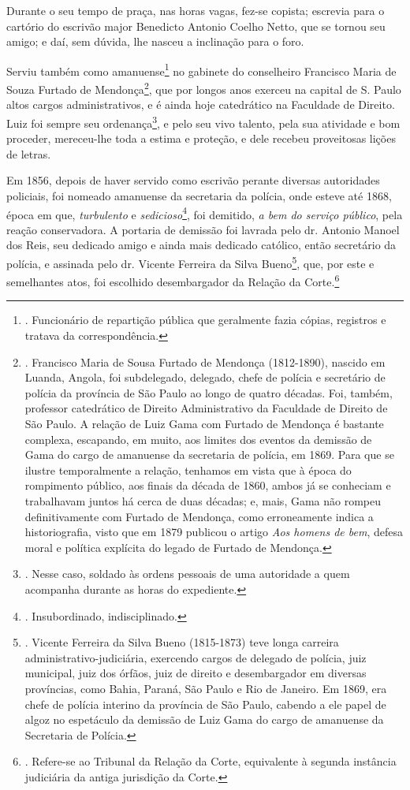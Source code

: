 Durante o seu tempo de praça, nas horas vagas, fez-se copista; escrevia
para o cartório do escrivão major Benedicto Antonio Coelho Netto, que se
tornou seu amigo; e daí, sem dúvida, lhe nasceu a inclinação para o
foro.

Serviu também como amanuense\footnote{. Funcionário de repartição
  pública que geralmente fazia cópias, registros e tratava da
  correspondência.} no gabinete do conselheiro Francisco Maria de Souza
Furtado de Mendonça\footnote{. Francisco Maria de Sousa Furtado de
  Mendonça (1812-1890), nascido em Luanda, Angola, foi subdelegado,
  delegado, chefe de polícia e secretário de polícia da província de São
  Paulo ao longo de quatro décadas. Foi, também, professor catedrático
  de Direito Administrativo da Faculdade de Direito de São Paulo. A
  relação de Luiz Gama com Furtado de Mendonça é bastante complexa,
  escapando, em muito, aos limites dos eventos da demissão de Gama do
  cargo de amanuense da secretaria de polícia, em 1869. Para que se
  ilustre temporalmente a relação, tenhamos em vista que à época do
  rompimento público, aos finais da década de 1860, ambos já se
  conheciam e trabalhavam juntos há cerca de duas décadas; e, mais, Gama
  não rompeu definitivamente com Furtado de Mendonça, como erroneamente
  indica a historiografia, visto que em 1879 publicou o artigo \emph{Aos
  homens de bem}, defesa moral e política explícita do legado de Furtado
  de Mendonça.}, que por longos anos exerceu na capital de S. Paulo
altos cargos administrativos, e é ainda hoje catedrático na Faculdade de
Direito. Luiz foi sempre seu ordenança\footnote{. Nesse caso, soldado às
  ordens pessoais de uma autoridade a quem acompanha durante as horas do
  expediente.}, e pelo seu vivo talento, pela sua atividade e bom
proceder, mereceu-lhe toda a estima e proteção, e dele recebeu
proveitosas lições de letras.

Em 1856, depois de haver servido como escrivão perante diversas
autoridades policiais, foi nomeado amanuense da secretaria da polícia,
onde esteve até 1868, época em que, \emph{turbulento} e
\emph{sedicioso}\footnote{. Insubordinado, indisciplinado.}, foi
demitido, \emph{a bem do serviço público}, pela reação conservadora. A
portaria de demissão foi lavrada pelo dr. Antonio Manoel dos Reis, seu
dedicado amigo e ainda mais dedicado católico, então secretário da
polícia, e assinada pelo dr. Vicente Ferreira da Silva Bueno\footnote{.
  Vicente Ferreira da Silva Bueno (1815-1873) teve longa carreira
  administrativo-judiciária, exercendo cargos de delegado de polícia,
  juiz municipal, juiz dos órfãos, juiz de direito e desembargador em
  diversas províncias, como Bahia, Paraná, São Paulo e Rio de Janeiro.
  Em 1869, era chefe de polícia interino da província de São Paulo,
  cabendo a ele papel de algoz no espetáculo da demissão de Luiz Gama do
  cargo de amanuense da Secretaria de Polícia.}, que, por este e
semelhantes atos, foi escolhido desembargador da Relação da
Corte.\footnote{. Refere-se ao Tribunal da Relação da Corte, equivalente
  à segunda instância judiciária da antiga jurisdição da Corte.}

